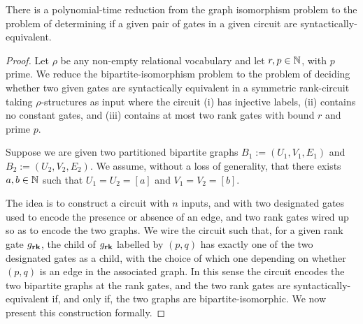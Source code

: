 \documentclass[../paper.tex]{subfiles}
\begin{document}
\begin{prop}
  There is a polynomial-time reduction from the graph isomorphism problem to the
  problem of determining if a given pair of gates in a given circuit are
  syntactically-equivalent.
  \label{prop:syntactic-graph-iso}
\end{prop}
\begin{proof}
  Let $\rho$ be any non-empty relational vocabulary and let $r, p \in \mathbb{N}$,
  with $p$ prime. We reduce the bipartite-isomorphism problem to the problem of
  deciding whether two given gates are syntactically equivalent in a symmetric
  rank-circuit taking $\rho$-structures as input where the circuit (i) has
  injective labels, (ii) contains no constant gates, and (iii) contains at most
  two rank gates with bound $r$ and prime $p$.

  Suppose we are given two partitioned bipartite graphs $B_1 := (U_1, V_1, E_1)$
  and $B_2 := (U_2, V_2, E_2)$. We assume, without a loss of generality, that
  there exists $a, b \in \mathbb{N}$ such that $U_1 = U_2 = [a]$ and $V_1 = V_2 =
  [b]$.

  The idea is to construct a circuit with $n$ inputs, and with two designated
  gates used to encode the presence or absence of an edge, and two rank gates
  wired up so as to encode the two graphs. We wire the circuit such that, for a
  given rank gate $g_{\text{\textbf{rk}}}$, the child of $g_{\text{\textbf{rk}}}$ labelled by $(p,q)$ has
  exactly one of the two designated gates as a child, with the choice of which
  one depending on whether $(p,q)$ is an edge in the associated graph. In this
  sense the circuit encodes the two bipartite graphs at the rank gates, and the
  two rank gates are syntactically-equivalent if, and only if, the two graphs
  are bipartite-isomorphic. We now present this construction formally.


\end{proof}
\end{document}
